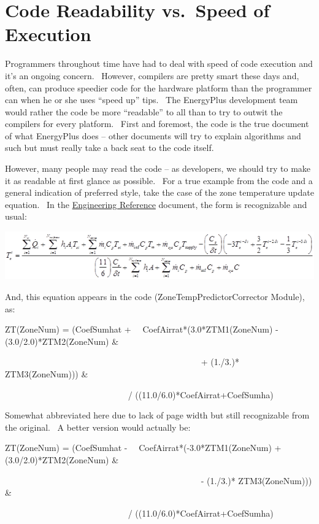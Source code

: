 \section{Code Readability vs.~Speed of Execution}\label{code-readability-vs.speed-of-execution}

Programmers throughout time have had to deal with speed of code execution and it's an ongoing concern.~ However, compilers are pretty smart these days and, often, can produce speedier code for the hardware platform than the programmer can when he or she uses ``speed up'' tips.~ The EnergyPlus development team would rather the code be more ``readable'' to all than to try to outwit the compilers for every platform.~ First and foremost, the code is the true document of what EnergyPlus does -- other documents will try to explain algorithms and such but must really take a back seat to the code itself.

However, many people may read the code -- as developers, we should try to make it as readable at first glance as possible.~ For a true example from the code and a general indication of preferred style, take the case of the zone temperature update equation.~ In the \href{EngineeringReference.pdf}{Engineering Reference} document, the form is recognizable and usual:

\includegraphics{media/image001.png}

And, this equation appears in the code (ZoneTempPredictorCorrector Module), as:

ZT(ZoneNum) = (CoefSumhat +~~ CoefAirrat*(3.0*ZTM1(ZoneNum) - (3.0/2.0)*ZTM2(ZoneNum) \&

~~~~~~~~~~~~~~~~~~~~~~~~~~~~~~~~~~~~~~~~~~~~~ + (1./3.)* ZTM3(ZoneNum))) \&

~~~~~~~~~~~~~~~~~~~~~~~~~~~~ / ((11.0/6.0)*CoefAirrat+CoefSumha)

Somewhat abbreviated here due to lack of page width but still recognizable from the original.~ A better version would actually be:

ZT(ZoneNum) = (CoefSumhat -~~ CoefAirrat*(-3.0*ZTM1(ZoneNum) + (3.0/2.0)*ZTM2(ZoneNum) \&

~~~~~~~~~~~~~~~~~~~~~~~~~~~~~~~~~~~~~~~~~~~~~ - (1./3.)* ZTM3(ZoneNum))) \&

~~~~~~~~~~~~~~~~~~~~~~~~~~~~ / ((11.0/6.0)*CoefAirrat+CoefSumha)

